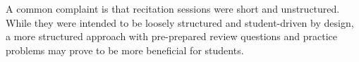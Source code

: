 A common complaint is that recitation sessions were short and
unstructured. While they were intended to be loosely
structured and student-driven by design, a more structured approach with
pre-prepared review questions and practice problems may prove to be
more beneficial for students.


